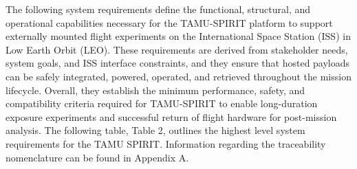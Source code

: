 \documentclass[conf]{new-aiaa}
\begin{document}
The following system requirements define the functional, structural, and operational capabilities necessary for the TAMU-SPIRIT platform to support externally mounted flight experiments on the International Space Station (ISS) in Low Earth Orbit (LEO). These requirements are derived from stakeholder needs, system goals, and ISS interface constraints, and they ensure that hosted payloads can be safely integrated, powered, operated, and retrieved throughout the mission lifecycle. Overall, they establish the minimum performance, safety, and compatibility criteria required for TAMU-SPIRIT to enable long-duration exposure experiments and successful return of flight hardware for post-mission analysis. The following table, Table 2, outlines the highest level system requirements for the TAMU SPIRIT. Information regarding the traceability nomenclature can be found in Appendix A. \cite{tamuSpiritQRGv3_2025,nasaSSP51721_2019,nasaHardwareEquipmentVol2_2025}
\end{document}
